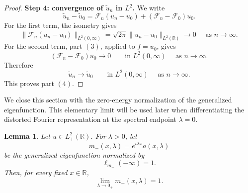 \documentclass[10pt]{article}
\newtheorem{lemma}[theorem]{Lemma}
\numberwithin{equation}{section}
\numberwithin{theorem}{section}
\begin{document}
\begin{proof}
\medskip
\noindent\textbf{Step 4: convergence of \(\widetilde u_n\) in \(L^2\).}
We write
\[
\widetilde u_n-\widetilde u_0
=
\mathcal F_n(u_n-u_0)+(\mathcal F_n-\mathcal F_0)u_0.
\]
For the first term, the isometry gives
\[
\|\mathcal F_n(u_n-u_0)\|_{L^2(0,\infty)}
=
\sqrt{2\pi}\|u_n-u_0\|_{L^2(\mathbb R)}
\to0 \quad \text{ as } n \to \infty.
\]
For the second term, part \((3)\), applied to \(f=u_0\), gives
\[
(\mathcal F_n-\mathcal F_0)u_0\to0
\qquad\text{in }L^2(0,\infty) \quad \text{ as } n \to \infty.
\]
Therefore
\[
\widetilde u_n\to\widetilde u_0
\qquad\text{in }L^2(0,\infty) \quad \text{ as } n \to \infty.
\]
This proves part \((4)\).

\end{proof}
\noindent
We close this section with the zero-energy normalization of the generalized
eigenfunction. This elementary limit will be used later when differentiating the
distorted Fourier representation at the spectral endpoint \(\lambda=0\).
\begin{lemma}
\label{lemma 2.5}
Let \(u\in L^{2}_+(\mathbb R)\). For
\(\lambda>0\), let
\[
m_-(x,\lambda)=e^{i\lambda x}a(x,\lambda)
\]
be the generalized eigenfunction normalized by
\[
\ell_{m_-}(-\infty)=1.
\]
Then, for every fixed \(x\in\mathbb R\),
\[
\lim_{\lambda\to0_{+}}m_-(x,\lambda)=1.
\]
\end{lemma}
\end{document}
